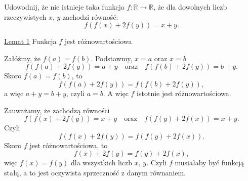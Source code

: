 \vspace{5px}

\begin{problem}{10}
	Udowodnij, że nie istnieje taka funkcja $f:\mathbb{R}\longrightarrow\mathbb{R}$, że dla dowolnych liczb rzeczywistych $x$, $y$ zachodzi równość:
	\[
		f(f(x) + 2f(y)) = x + y.
	\]
\end{problem}

\noindent
\underline{Lemat 1} Funkcja $f$ jest różnowartościowa

\vspace{10px}
\noindent
Załóżmy, że $f(a) = f(b)$. Podstawmy, $x=a$ oraz $x = b$
\[
	f(f(a) + 2f(y)) = a + y \quad \text{oraz} \quad f(f(b) + 2f(y)) = b + y.
\] 
Skoro $f(a)=f(b)$, to 
\[
	f(f(a) + 2f(y)) = f(f(b) + 2f(y)),
\] 
a więc $a + y = b + y$, czyli $a = b$. A więc $f$ istotnie jest różnowartościowa.
\vspace{10px}

\noindent
Zauważamy, że zachodzą równości
\[
	f(f(x) + 2f(y)) = x + y \quad \text{oraz} \quad f(f(y)+2f(x))=x+y.
\]
Czyli 
\[
	f(f(x) + 2f(y)) = f(f(y) + 2f(x)).
\] 
Skoro $f$ jest różnowartościowa, to 
\[
	f(x)+2f(y)=f(y)+2f(x),
\]
więc $f(x)=f(y)$ dla wszystkich liczb $x$, $y$. Czyli $f$ musiałaby być funkcją stałą, a to jest oczywista sprzeczność z danym równaniem.
